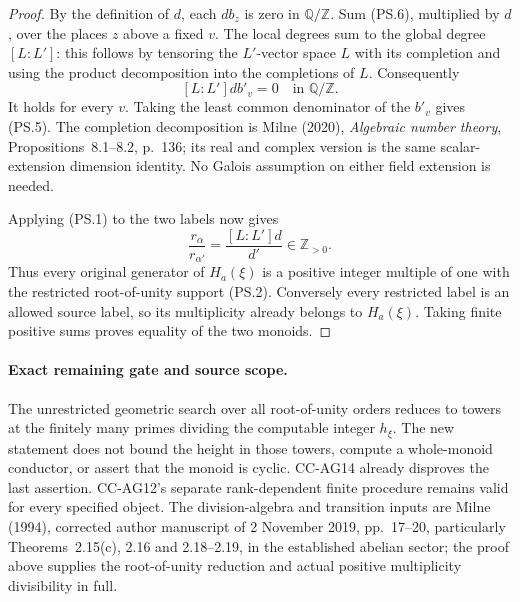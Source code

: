 \begin{proof}
By the definition of $d$, each $d b_z$ is zero in $\mathbb Q/\mathbb Z$.
Sum (PS.6), multiplied by $d$, over the places $z$ above a fixed $v$.
The local degrees sum to the global degree $[L:L']$: this follows by
tensoring the $L'$-vector space $L$ with its completion and using the
product decomposition into the completions of $L$. Consequently
\[
                              [L:L']d b'_v=0
                           \quad\text{in }\mathbb Q/\mathbb Z.
                                                               \tag{PS.7}
\]
It holds for every $v$. Taking the least common denominator of the
$b'_v$ gives (PS.5). The completion decomposition is Milne (2020),
\emph{Algebraic number theory}, Propositions~8.1--8.2, p.~136;
its real and complex version is the same scalar-extension dimension
identity. No Galois assumption on either field extension is needed.

Applying (PS.1) to the two labels now gives
\[
                 \frac{r_\alpha}{r_{\alpha'}}
                          =\frac{[L:L']d}{d'}\in\mathbb Z_{>0}.
                                                               \tag{PS.8}
\]
Thus every original generator of $H_a(\xi)$ is a positive integer
multiple of one with the restricted root-of-unity support (PS.2).
Conversely every restricted label is an allowed source label, so its
multiplicity already belongs to $H_a(\xi)$. Taking finite positive sums
proves equality of the two monoids.
\end{proof}

\paragraph{Exact remaining gate and source scope.}
The unrestricted geometric search over all root-of-unity orders reduces
to towers at the finitely many primes dividing the computable integer
$h_\xi$. The new statement does not bound the height in those towers,
compute a whole-monoid conductor, or assert that the monoid is cyclic.
CC-AG14 already disproves the last assertion. CC-AG12's separate
rank-dependent finite procedure remains valid for every specified object.
The division-algebra and transition inputs are Milne (1994), corrected
author manuscript of 2 November 2019, pp.~17--20, particularly
Theorems~2.15(c), 2.16 and 2.18--2.19, in the established abelian sector;
the proof above supplies the root-of-unity reduction and actual positive
multiplicity divisibility in full.
